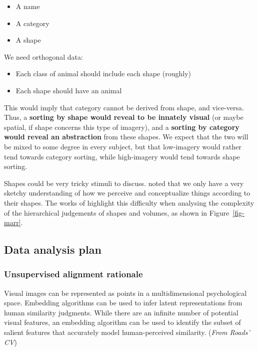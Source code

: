\documentclass[
  authoryear]{elsarticle}
\begin{document}
\begin{itemize}
\item
  A name
\item
  A category
\item
  A shape
\end{itemize}

We need orthogonal data:

\begin{itemize}
\item
  Each class of animal should include each shape (roughly)
\item
  Each shape should have an animal
\end{itemize}

This would imply that category cannot be derived from shape, and
vice-versa. Thus, a \textbf{sorting by shape would reveal to be innately
visual} (or maybe spatial, if shape concerns this type of imagery), and
a \textbf{sorting by category would reveal an abstraction} from these
shapes. We expect that the two will be mixed to some degree in every
subject, but that low-imagery would rather tend towards category
sorting, while high-imagery would tend towards shape sorting.

Shapes could be very tricky stimuli to discuss.
\citet{gardenforsConceptualSpacesFramework2004} noted that we only have
a very sketchy understanding of how we perceive and conceptualize things
according to their shapes. The works of \citet{marr1997} highlight this
difficulty when analysing the complexity of the hierarchical judgements
of shapes and volumes, as shown in Figure~\ref{fig-marr}.

\subsection{Data analysis plan}\label{data-analysis-plan}

\subsubsection{Unsupervised alignment
rationale}\label{unsupervised-alignment-rationale}

Visual images can be represented as points in a multidimensional
psychological space. Embedding algorithms can be used to infer latent
representations from human similarity judgments. While there are an
infinite number of potential visual features, an embedding algorithm can
be used to identify the subset of salient features that accurately model
human-perceived similarity. (\emph{From Roads' CV})
\end{document}
